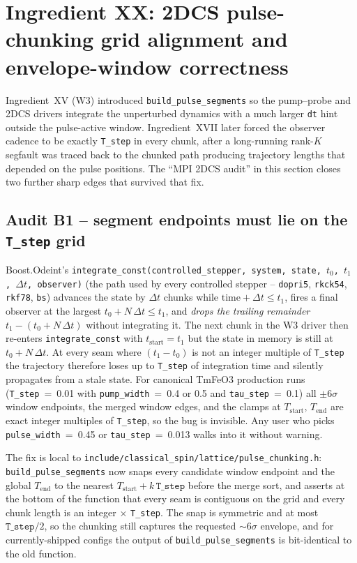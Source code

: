 \documentclass[11pt,letterpaper]{article}
\begin{document}
\section{Ingredient XX: 2DCS pulse-chunking grid alignment and
envelope-window correctness}

Ingredient~XV (W3) introduced \texttt{build\_pulse\_segments} so the
pump--probe and 2DCS drivers integrate the unperturbed dynamics with
a much larger \texttt{dt} hint outside the pulse-active window.
Ingredient~XVII later forced the observer cadence to be exactly
\texttt{T\_step} in every chunk, after a long-running rank-$K$
segfault was traced back to the chunked path producing trajectory
lengths that depended on the pulse positions.  The ``MPI 2DCS audit''
in this section closes two further sharp edges that survived
that fix.

\subsection*{Audit B1 -- segment endpoints must lie on the
\texttt{T\_step} grid}

Boost.Odeint's
\texttt{integrate\_const(controlled\_stepper,~system,~state,
$t_0$,~$t_1$,~$\Delta t$,~observer)} (the path used by every
controlled stepper -- \texttt{dopri5}, \texttt{rkck54},
\texttt{rkf78}, \texttt{bs}) advances the state by $\Delta t$
chunks while $\text{time} + \Delta t \le t_1$, fires a final
observer at the largest $t_0 + N\,\Delta t \le t_1$, and
\emph{drops the trailing remainder} $t_1 - (t_0 + N\,\Delta t)$
without integrating it.  The next chunk in the W3 driver then
re-enters \texttt{integrate\_const} with $t_\text{start} = t_1$
but the state in memory is still at $t_0 + N\,\Delta t$.  At every
seam where $(t_1 - t_0)$ is not an integer multiple of
\texttt{T\_step} the trajectory therefore loses up to \texttt{T\_step}
of integration time and silently propagates from a stale state.
For canonical TmFeO3 production runs (\texttt{T\_step}~=~0.01 with
\texttt{pump\_width}~=~0.4 or 0.5 and \texttt{tau\_step}~=~0.1) all
$\pm 6\sigma$ window endpoints, the merged window edges, and the
clamps at $T_\text{start},\,T_\text{end}$ are exact integer
multiples of \texttt{T\_step}, so the bug is invisible.  Any user
who picks
\texttt{pulse\_width}~=~0.45 or \texttt{tau\_step}~=~0.013 walks into
it without warning.

The fix is local to \texttt{include/classical\_spin/lattice/pulse\_chunking.h}:
\texttt{build\_pulse\_segments} now snaps every candidate window
endpoint and the global $T_\text{end}$ to the nearest
$T_\text{start} + k\,\texttt{T\_step}$ before the merge sort, and
asserts at the bottom of the function that every seam is contiguous
on the grid and every chunk length is an integer $\times$
\texttt{T\_step}.  The snap is symmetric and at most
$\texttt{T\_step}/2$, so the chunking still captures the requested
$\sim 6\sigma$ envelope, and for currently-shipped configs the
output of \texttt{build\_pulse\_segments} is bit-identical to the
old function.
\end{document}
